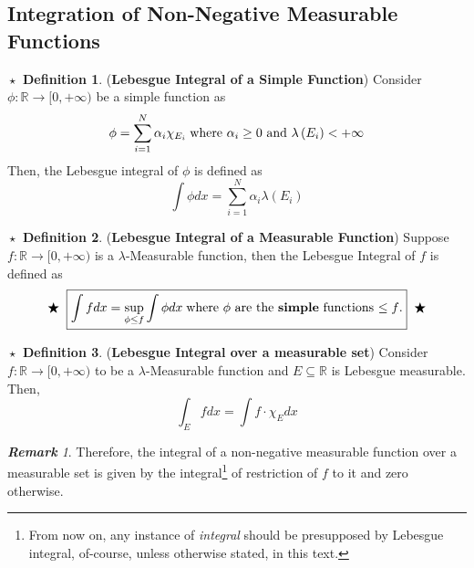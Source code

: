 \documentclass{article}
\theoremstyle{definition}
\newtheorem{definition}{$\boxed{\star}$ Definition}
\theoremstyle{remark}
\newtheorem*{remark}{\textbf{Remark}}
\theoremstyle{definition}
\theoremstyle{definition}
\theoremstyle{definition}
\newcommand{\R}{\mathbb{R}}
\newcommand{\lm}[1]{\lambda\left (#1\right )}
\begin{document}
 \subsection{Integration of Non-Negative Measurable Functions}
 \begin{definition}
 	(\textbf{Lebesgue Integral of a Simple Function}) Consider $ \phi: \R \to [0,+\infty) $ be a simple function as
 	\[\phi = \sum_{i=1}^{N} \alpha_i \chi_{E_i}\;\text{where $ \alpha_i \ge 0 $ and $ \lm{E_i} < +\infty $}\]
 	Then, the Lebesgue integral of $ \phi $ is defined as
 	\[\int \phi dx = \sum_{i=1}^{N}\alpha_i \lm{E_i}\]
 \end{definition}
\hrulefill

\begin{definition}
	(\textbf{Lebesgue Integral of a Measurable Function}) Suppose $ f : \R\to [0,+\infty) $ is a $ \lambda $-Measurable function, then the Lebesgue Integral of $ f $ is defined as
	\begin{equation*}
		\begin{split}
		\bigstar\;\;	\boxed{\int f dx = \sup_{\phi\le f} \int \phi dx\;\text{where $ \phi $ are the \textbf{simple} functions $ \le f $.}}\;\; \bigstar
		\end{split}
	\end{equation*}
\end{definition}
\hrulefill
\begin{definition}
	(\textbf{Lebesgue Integral over a measurable set}) Consider $ f : \R \to [0,+\infty) $ to be a $ \lambda $-Measurable function and $ E\subseteq \R $ is Lebesgue measurable. Then,
	\[\int_E f dx = \int f \cdot\chi_E dx\]
\end{definition}
\begin{remark}
	Therefore, the integral of a non-negative measurable function over a measurable set is given by the integral\footnote{From now on, any instance of \emph{integral} should be presupposed by Lebesgue integral, of-course, unless otherwise stated, in this text.} of restriction of $ f $ to it and zero otherwise.
\end{remark}
\hrulefill
\end{document}
